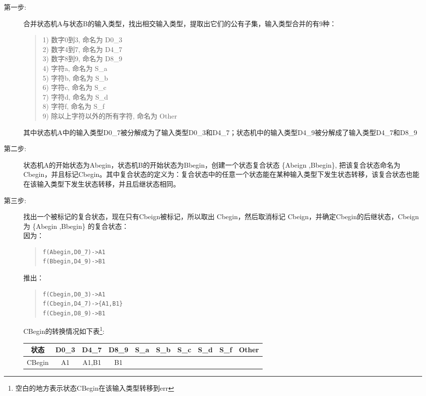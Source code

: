 \begin{description}
\item[第一步:]合并状态机A与状态B的输入类型，找出相交输入类型，提取出它们的公有子集，输入类型合并的有9种：
\begin{quote}
1) 数字0到3, 命名为 D0\_3 \\
2) 数字4到7, 命名为 D4\_7 \\
3) 数字8到9, 命名为 D8\_9 \\
4) 字符a,  命名为 S\_a \\
5) 字符b,  命名为 S\_b \\
6) 字符c,  命名为 S\_c \\
7) 字符d,  命名为 S\_d \\
8) 字符f,  命名为 S\_f \\
9) 除以上字符以外的所有字符, 命名为 Other
\end{quote}
其中状态机A中的输入类型D0\_7被分解成为了输入类型D0\_3和D4\_7；状态机中的输入类型D4\_9被分解成了输入类型D4\_7和D8\_9
\item[第二步:]状态机A的开始状态为Abegin，状态机B的开始状态为Bbegin，创建一个状态复合状态 \{Abeign ,Bbegin\}, 把该复合状态命名为Cbegin，并且标记Cbegin。其中复合状态的定义为：复合状态中的任意一个状态能在某种输入类型下发生状态转移，该复合状态也能在该输入类型下发生状态转移，并且后继状态相同。
\item[第三步:]找出一个被标记的复合状态，现在只有Cbeign被标记，所以取出 Cbegin，然后取消标记 Cbeign，并确定Cbegin的后继状态，Cbeign 为 \{Abegin ,Bbegin\} 的复合状态：\\
因为：
\begin{quote}
\begin{verbatim}
f(Abegin,D0_7)->A1
f(Bbegin,D4_9)->B1
\end{verbatim}
\end{quote}
推出：
\begin{quote}
\begin{verbatim}
f(Cbegin,D0_3)->A1
f(Cbegin,D4_7)->{A1,B1}
f(Cbegin,D8_9)->B1
\end{verbatim}
\end{quote}
CBegin的转换情况如下表\footnote{空白的地方表示状态CBegin在该输入类型转移到err}:

\begin{tabular}[c]{c|c|c|c|c|c|c|c|c|c}
状态&	D0\_3&D4\_7&D8\_9&S\_a&S\_b&S\_c&S\_d&S\_f&Other \\
\hline
CBegin&A1&A1,B1&B1&&&&&&\\
\hline
\end{tabular}


\end{description}

